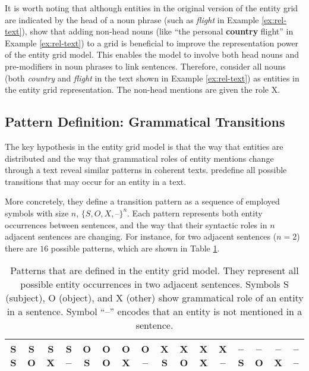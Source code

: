 It is worth noting that although entities in the original version of the entity grid are indicated by the head of a noun phrase (such as \emph{flight} in Example \ref{ex:rel-text}),  show that adding non-head nouns (like ``the personal \textbf{country} flight'' in Example \ref{ex:rel-text}) to a grid is beneficial to improve the representation power of the entity grid model. 
This enables the model to involve both head nouns and pre-modifiers in noun phrases to link sentences. 
Therefore,  consider all nouns (both \emph{country} and \emph{flight} in the text shown in Example \ref{ex:rel-text}) as entities in the entity grid representation.  
The non-head mentions are given the role X. 

\subsection{Pattern Definition: Grammatical Transitions}

The key hypothesis in the entity grid model is that the way that entities are distributed and the way that grammatical roles of entity mentions change through a text reveal similar patterns in coherent texts.  
 predefine all possible transitions that may occur for an entity in a text. 

More concretely, they define a transition pattern as a sequence of employed symbols with size $n$, $\{ S,O,X,\textit{--} \}^n$. 
Each pattern represents both entity occurrences between sentences, and the way that their syntactic roles in $n$ adjacent sentences are changing. 
For instance, for two adjacent sentences ($n=2$) there are $16$ possible patterns, which are shown in Table \ref{table:rel-egrid-pattern}.

\begin{table}[!ht]
	\begin{center}
		\resizebox{\columnwidth}{!}
		{%
			\begin{tabular}{@{}cccccccccccccccc@{}}
			\toprule
			S S & S O & S X & S -- & 
			O S & O O & O X & O -- & 
			X S & X O & X X & X -- & 
			-- S & -- O & -- X & -- -- 
			\\
			\bottomrule	
			\end{tabular}
		}%
	\end{center}
	\caption{Patterns that are defined in the entity grid model.  
	They represent all possible entity occurrences in two adjacent sentences. 
	Symbols S (subject), O (object), and X (other) show grammatical role of an entity in a sentence. Symbol ``--'' encodes that an entity is not mentioned in a sentence.}
	\label{table:rel-egrid-pattern}
\end{table}

